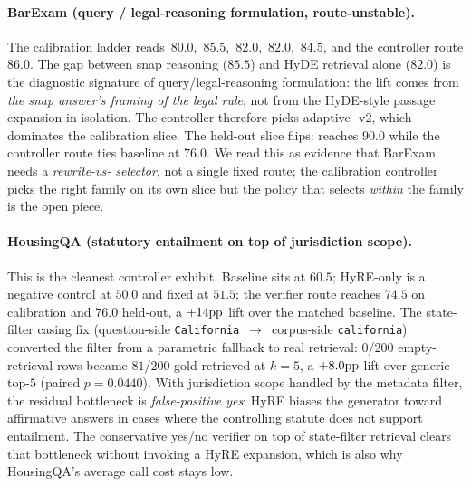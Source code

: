 \paragraph{BarExam (query / legal-reasoning formulation, route-unstable).}
The calibration ladder reads
\,$80.0$,
\,$85.5$,
\,$82.0$,
\,$82.0$,
\,$84.5$, and the controller route $86.0$. The
gap between snap reasoning ($85.5$) and HyDE retrieval alone ($82.0$) is the
diagnostic signature of query/legal-reasoning formulation: the lift comes from
\emph{the snap answer's framing of the legal rule}, not from the HyDE-style
passage expansion in isolation. The controller therefore picks adaptive
\hyre{}-v2, which dominates the calibration slice. The held-out slice flips:
 reaches $90.0$ while the controller route ties baseline at
$76.0$. We read this as evidence that BarExam needs a \emph{rewrite-vs-\hyre{}
selector}, not a single fixed route; the calibration controller picks the
right family on its own slice but the policy that selects \emph{within} the
family is the open piece.

\paragraph{HousingQA (statutory entailment on top of jurisdiction scope).}
This is the cleanest controller exhibit. Baseline
 sits at $60.5$; HyRE-only is a negative control at
$50.0$ and fixed \hyre{} at $51.5$; the verifier route reaches $74.5$ on
calibration and $76.0$ held-out, a $+14\mathrm{pp}$ lift over the matched
baseline. The state-filter casing fix (question-side
\texttt{California}~$\rightarrow$~corpus-side \texttt{california}) converted the
filter from a parametric fallback to real retrieval: 0/200 empty-retrieval
rows became $81/200$ gold-retrieved at $k=5$, a $+8.0\mathrm{pp}$ lift over
generic top-$5$ (paired $p=0.0440$). With jurisdiction scope handled by the
metadata filter, the residual bottleneck is \emph{false-positive yes}: HyRE
biases the generator toward affirmative answers in cases where the controlling
statute does not support entailment. The conservative yes/no verifier on top
of state-filter retrieval clears that bottleneck without invoking a HyRE
expansion, which is also why HousingQA's average call cost stays low.

